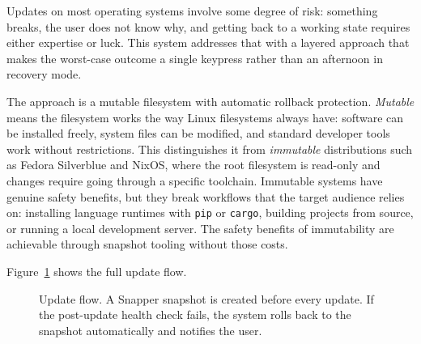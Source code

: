 Updates on most operating systems involve some degree of risk: something breaks,
the user does not know why, and getting back to a working state requires either
expertise or luck. This system addresses that with a layered approach that makes
the worst-case outcome a single keypress rather than an afternoon in recovery
mode.

The approach is a mutable filesystem with automatic rollback protection.
\emph{Mutable} means the filesystem works the way Linux filesystems always have:
software can be installed freely, system files can be modified, and standard
developer tools work without restrictions. This distinguishes it from
\emph{immutable} distributions such as Fedora Silverblue and NixOS, where the
root filesystem is read-only and changes require going through a specific
toolchain. Immutable systems have genuine safety benefits, but they break
workflows that the target audience relies on: installing language runtimes with
\texttt{pip} or \texttt{cargo}, building projects from source, or running a
local development server. The safety benefits of immutability are achievable
through snapshot tooling without those costs.

Figure~\ref{fig:update-flow} shows the full update flow.

\begin{figure}[htbp]
\centering
{}
\caption{Update flow. A Snapper snapshot is created before every update.
If the post-update health check fails, the system rolls back to the snapshot
automatically and notifies the user.}
\label{fig:update-flow}
\end{figure}

